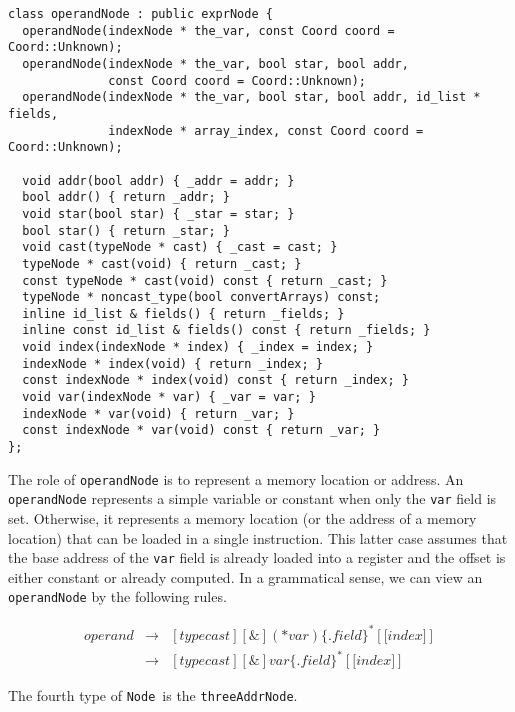 \documentclass{article}
\newcommand{\node}{\texttt{Node}}
\begin{document}
\begin{verbatim}
class operandNode : public exprNode {
  operandNode(indexNode * the_var, const Coord coord = Coord::Unknown);
  operandNode(indexNode * the_var, bool star, bool addr, 
              const Coord coord = Coord::Unknown);
  operandNode(indexNode * the_var, bool star, bool addr, id_list * fields, 
              indexNode * array_index, const Coord coord = Coord::Unknown);

  void addr(bool addr) { _addr = addr; }
  bool addr() { return _addr; }
  void star(bool star) { _star = star; }
  bool star() { return _star; }
  void cast(typeNode * cast) { _cast = cast; }
  typeNode * cast(void) { return _cast; }
  const typeNode * cast(void) const { return _cast; }
  typeNode * noncast_type(bool convertArrays) const;
  inline id_list & fields() { return _fields; }
  inline const id_list & fields() const { return _fields; }
  void index(indexNode * index) { _index = index; }
  indexNode * index(void) { return _index; }
  const indexNode * index(void) const { return _index; }
  void var(indexNode * var) { _var = var; }
  indexNode * var(void) { return _var; }
  const indexNode * var(void) const { return _var; }
};
\end{verbatim}

The role of \texttt{operandNode} is to represent a memory location or
address.  An \texttt{operandNode} represents a simple variable or
constant when only the \texttt{var} field is set.  Otherwise, it
represents a memory location (or the address of a memory location)
that can be loaded in a single instruction.  This latter case assumes
that the base address of the \texttt{var} field is already loaded into
a register and the offset is either constant or already computed.  In
a grammatical sense, we can view an \texttt{operandNode} by the
following rules.

\begin{eqnarray*}
operand & \rightarrow & [typecast][\texttt{\&}] (\texttt{*} var) \{.field\}^*
          [ \texttt{[} index \texttt{]}] \\
        & \rightarrow & [typecast][\texttt{\&}] var \{.field\}^*
          [ \texttt{[} index \texttt{]}]
\end{eqnarray*}

The fourth type of \node\ is the \texttt{threeAddrNode}.
\end{document}
